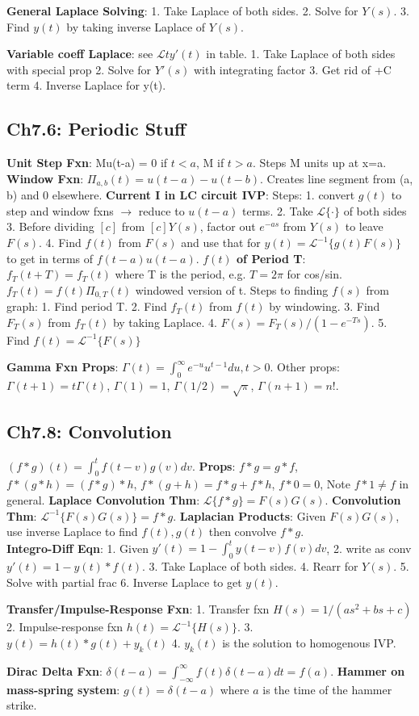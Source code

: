 \textbf{General Laplace Solving}: 1. Take Laplace of both sides. 2. Solve for $Y(s)$. 3. Find $y(t)$ by taking inverse Laplace of $Y(s)$.

\textbf{Variable coeff Laplace}: see $\mathcal{L}{ty'(t)}$ in table. 1. Take Laplace of both sides with special prop 2. Solve for $Y'(s)$ with integrating factor
3. Get rid of +C term 4. Inverse Laplace for y(t). 

\subsection*{Ch7.6: Periodic Stuff}
\textbf{Unit Step Fxn}: Mu(t-a) = 0 if $t<a$, M if $t>a$. Steps M units up at x=a. 
\textbf{Window Fxn}: $\Pi_{a,b}(t) = u(t-a) - u(t-b)$. Creates line segment from (a, b) and 0 elsewhere.
\textbf{Current I in LC circuit IVP}: Steps: 1. convert $g(t)$ to step and window fxns $\rightarrow$ reduce to $u(t-a)$ terms. 
2. Take $\mathcal{L}\{\cdot \}$ of both sides 3. Before dividing $[c]$ from $[c]Y(s)$, factor out $e^{-as}$ from $Y(s)$ to leave $F(s)$. 
4. Find $f(t)$ from $F(s)$ and use that for $y(t) = \mathcal{L}^{-1}\{g(t)F(s)\}$ to get in terms of $f(t-a)u(t-a)$. 
\textbf{$f(t)$ of Period T}: $f_T(t + T) = f_T(t)$ where T is the period, e.g. $T = 2\pi$ for cos/sin. $f_T(t) = f(t)\Pi_{0, T}(t)$ windowed version of t. 
Steps to finding $f(s)$ from graph: 1. Find period T. 2. Find $f_T(t)$ from $f(t)$ by windowing. 3. Find $F_T(s)$ from $f_T(t)$ by taking Laplace. 
4. $F(s) = F_T(s)/(1-e^{-Ts})$. 5. Find $f(t) = \mathcal{L}^{-1}\{F(s)\}$ 

\textbf{Gamma Fxn Props}: $\Gamma(t) = \int_0^{\infty}e^{-u}u^{t-1}du, t>0$. Other props: $\Gamma(t+1) = t\Gamma(t)$, $\Gamma(1) = 1$, 
$\Gamma(1/2) = \sqrt{\pi}$, $\Gamma(n+1) = n!$. 

\subsection*{Ch7.8: Convolution}

$(f*g)(t) = \int_0^t f(t-v)g(v)dv$. \textbf{Props}: $f*g = g*f$, $f*(g*h) = (f*g)*h$, $f*(g+h) = f*g + f*h$, $f*0 = 0$, Note $f*1 \neq f$ in general. 
\textbf{Laplace Convolution Thm}: $\mathcal{L}\{f*g\} = F(s)G(s)$. \textbf{Convolution Thm}: $\mathcal{L}^{-1}\{F(s)G(s)\} = f*g$. 
\textbf{Laplacian Products}: Given $F(s)G(s)$, use inverse Laplace to find $f(t), g(t)$ then convolve $f*g$.
\\
\textbf{Integro-Diff Eqn}: 1. Given $y'(t) = 1-\int_0^ty(t-v)f(v)dv$, 2. write as conv $y'(t)=1-y(t)*f(t)$. 3. Take Laplace of both sides. 4. Rearr for $Y(s)$.
5. Solve with partial frac 6. Inverse Laplace to get $y(t)$.

\textbf{Transfer/Impulse-Response Fxn}: 1. Transfer fxn $H(s) = 1/(as^2+bs+c)$ 2. Impulse-response fxn $h(t) = \mathcal{L}^{-1}\{H(s)\}$.
3. $y(t) = h(t)*g(t) + y_k(t)$ 4. $y_k(t)$ is the solution to homogenous IVP.

\textbf{Dirac Delta Fxn}: $\delta(t-a) = \int_{-\infty}^{\infty} f(t)\delta(t-a)dt = f(a)$. 
\textbf{Hammer on mass-spring system}: $g(t) = \delta(t-a)$ where $a$ is the time of the hammer strike.